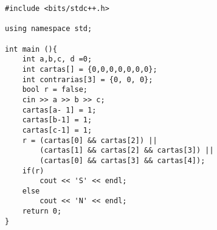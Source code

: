 \begin{verbatim}
#include <bits/stdc++.h>

using namespace std;

int main (){
	int a,b,c, d =0;
	int cartas[] = {0,0,0,0,0,0,0};
	int contrarias[3] = {0, 0, 0};
	bool r = false;
	cin >> a >> b >> c;
	cartas[a- 1] = 1;
	cartas[b-1] = 1;
	cartas[c-1] = 1;
	r =	(cartas[0] && cartas[2]) ||
		(cartas[1] && cartas[2] && cartas[3]) ||
		(cartas[0] && cartas[3] && cartas[4]);
	if(r)
		cout << 'S' << endl;
	else
		cout << 'N' << endl;
	return 0;
}

\end{verbatim}
